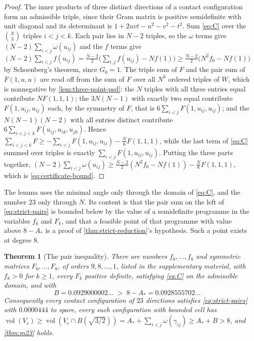 \documentclass[11pt,reqno]{amsart}
\renewcommand{\_}{\origunderscore\allowbreak}
\numberwithin{equation}{section}
\theoremstyle{plain}
\newtheorem{thm}{Theorem}[section]
\theoremstyle{definition}
\theoremstyle{remark}
\DeclareMathOperator{\vol}{vol}
\begin{document}
\begin{proof}
The inner products of three distinct directions of a contact
configuration form an admissible triple, since their Gram matrix is
positive semidefinite with unit diagonal and its determinant is
$1+2uvt-u^2-v^2-t^2$. Sum \eqref{eq:C} over the $\binom N3$ triples
$i<j<k$. Each pair lies in $N-2$ triples, so the $\omega$ terms give
$(N-2)\sum_{i<j}\omega(u_{ij})$ and the $f$ terms give
$(N-2)\sum_{i<j}f(u_{ij})=\tfrac{N-2}2\bigl(\sum_{i,j}f(u_{ij})-Nf(1)\bigr)
\ge\tfrac{N-2}2\bigl(N^2f_0-Nf(1)\bigr)$ by Schoenberg's theorem, since
$G_0=1$. The triple sum of $F$ and the pair sum of $F(1,u,u)$ are read
off from the sum of $F$ over all $N^3$ ordered triples of $W$, which is
nonnegative by \cref{lem:three-point-psd}: the $N$ triples with all
three entries equal contribute $NF(1,1,1)$; the $3N(N-1)$ with exactly
two equal contribute $F(1,u_{ij},u_{ij})$ each, by the symmetry of $F$,
that is $6\sum_{i<j}F(1,u_{ij},u_{ij})$; and the $N(N-1)(N-2)$ with all
entries distinct contribute $6\sum_{i<j<k}F(u_{ij},u_{ik},u_{jk})$.
Hence
$\sum_{i<j<k}F\ge-\sum_{i<j}F(1,u_{ij},u_{ij})-\tfrac N6F(1,1,1)$, while
the last term of \eqref{eq:C} summed over triples is exactly
$\sum_{i<j}F(1,u_{ij},u_{ij})$. Putting the three parts together,
$(N-2)\sum_{i<j}\omega(u_{ij})\ge\tfrac{N-2}2(N^2f_0-Nf(1))-\tfrac N6F(1,1,1)$,
which is \eqref{eq:certificate-bound}.
\end{proof}

The lemma uses the minimal angle only through the domain of
\eqref{eq:C}, and the number $23$ only through $N$. Its content is that
the pair sum on the left of \eqref{eq:strict-pairs} is bounded below by
the value of a semidefinite programme in the variables $f_k$ and $F_k$,
and that a feasible point of that programme with value above
$8-A_*$ is a proof of \cref{thm:strict-reduction}'s hypothesis. Such a
point exists at degree $8$.

\begin{thm}[The pair inequality]\label{thm:certificate}
There are numbers $f_0,\dots,f_8$ and symmetric matrices
$F_0,\dots,F_8$, of orders $9,8,\dots,1$, listed in the supplementary
material, with $f_k>0$ for $k\ge1$, every $F_k$ positive definite,
satisfying \eqref{eq:C} on the admissible domain, and with
\[
  B=0.0929000002\ldots\;>\;8-A_*=0.0928555702\ldots
\]
Consequently every contact configuration of $23$ directions satisfies
\eqref{eq:strict-pairs} with $0.0000444$ to spare, every such
configuration with bounded cell has
$\vol(V_c)\ge\vol(V_c\cap B(\sqrt{3/2}))=A_*+\sum_{i<j}\omega(\gamma_{ij})\ge A_*+B>8$,
and \cref{thm:m23} holds.
\end{thm}
\end{document}
